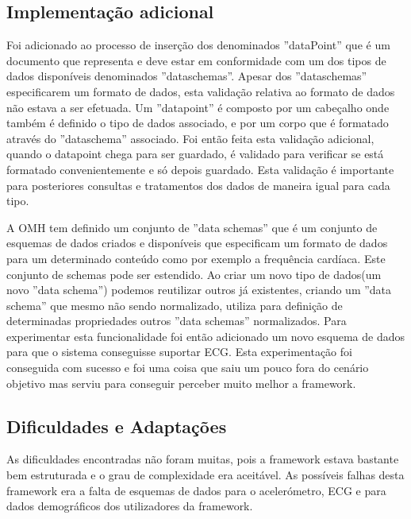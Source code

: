 \subsection{Implementação adicional}

Foi adicionado ao processo de inserção dos denominados ''dataPoint'' que é um documento que representa e deve estar em conformidade com um dos tipos de dados disponíveis denominados ''dataschemas''. Apesar dos ''dataschemas'' especificarem um formato de dados, esta validação relativa ao formato de dados não estava a ser efetuada. Um ''datapoint'' é composto por um cabeçalho onde também é definido o tipo de dados associado, e por um corpo que é formatado através do ''dataschema'' associado. Foi então feita esta validação adicional, quando o datapoint chega para ser guardado, é validado para verificar se está formatado convenientemente e só depois guardado. Esta validação é importante para posteriores consultas e tratamentos dos dados de maneira igual para cada tipo.
\par 


A \gls{OMH} tem definido um conjunto de ''data schemas'' \cite{omhschemas} que é um conjunto de esquemas de dados criados e disponíveis que especificam um formato de dados para um determinado conteúdo como por exemplo a frequência cardíaca\cite{omhschemas}. Este conjunto de schemas pode ser estendido. Ao criar um novo tipo de dados(um novo ''data schema'') podemos reutilizar outros já existentes, criando um ''data schema'' que mesmo não sendo normalizado, utiliza para definição de determinadas propriedades outros ''data schemas'' normalizados. Para experimentar esta funcionalidade foi então adicionado um novo esquema de dados para que o sistema conseguisse suportar \gls{ECG}. Esta experimentação foi conseguida com sucesso e foi uma coisa que saiu um pouco fora do cenário objetivo mas serviu para conseguir perceber muito melhor a framework. \par 

\subsection{Dificuldades e Adaptações}

As dificuldades encontradas não foram muitas, pois a framework estava bastante bem estruturada e o grau de complexidade era aceitável. As possíveis falhas desta framework era a falta de esquemas de dados para o acelerómetro, \gls{ECG} e para dados demográficos dos utilizadores da framework.

